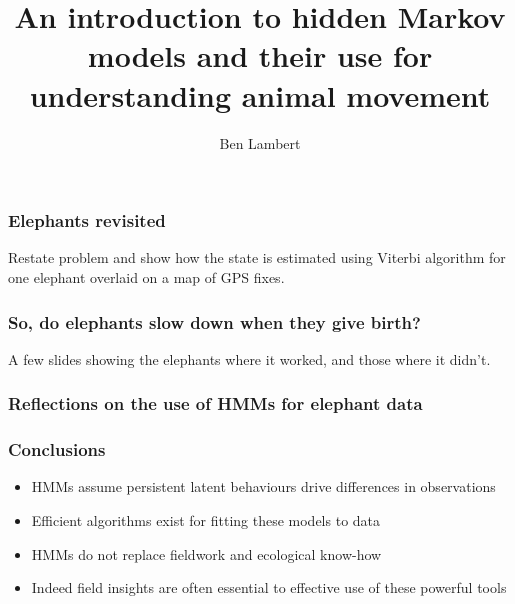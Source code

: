 \documentclass{beamer}
\title[] %
{An introduction to hidden Markov models and their use for understanding animal movement}
\date{}
\author[Lambert] %
{Ben Lambert}
\begin{document}
\frame{\titlepage}







\begin{frame}
\frametitle{Elephants revisited}

Restate problem and show how the state is estimated using Viterbi algorithm for one elephant overlaid on a map of GPS fixes.
    
\end{frame}

\begin{frame}
\frametitle{So, do elephants slow down when they give birth?}

A few slides showing the elephants where it worked, and those where it didn't.
    
\end{frame}

\begin{frame}
\frametitle{Reflections on the use of HMMs for elephant data}
    
\end{frame}

\begin{frame}
\frametitle{Conclusions}

\begin{itemize}
    \item HMMs assume persistent latent behaviours drive differences in observations
    \item Efficient algorithms exist for fitting these models to data
    \item HMMs do not replace fieldwork and ecological know-how
    \item Indeed field insights are often essential to effective use of these powerful tools
\end{itemize}
    
\end{frame}
\end{document}
